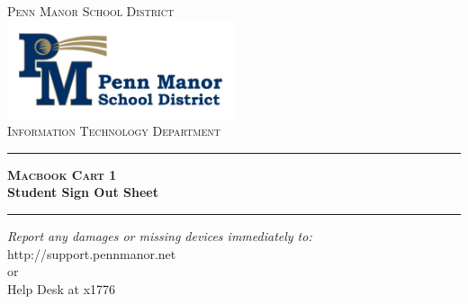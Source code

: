 \begin{titlepage}

\begin{center}

\textsc{\LARGE Penn Manor School District}\\[1.5cm]


\includegraphics[width=0.5\textwidth]{images/logo}\\[1cm]    


\textsc{\Large Information Technology Department}\\[0.5cm]


\hrule 
{ \huge \bfseries \textsc{Macbook Cart} 1\\ \vspace{0.5cm} Student Sign Out Sheet}\\[0.4cm]

\hrule 

\vfill
\begin{center} \large
\emph{Report any damages or missing devices immediately to:}\\
http://support.pennmanor.net \\or\\Help Desk at x1776
\end{center}

\vfill

\end{center}

\end{titlepage}